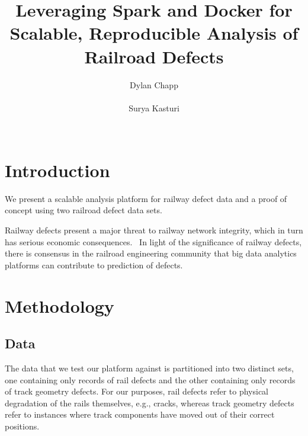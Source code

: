 \documentclass{sig-alternate-05-2015}
\begin{document}

\doi{}

\isbn{}

\conferenceinfo{}{}

\acmPrice{}

%
\conferenceinfo{}{}

\title{Leveraging Spark and Docker for Scalable, Reproducible Analysis of Railroad Defects}

\author{
\alignauthor
Dylan Chapp\\
       \\
\alignauthor
Surya Kasturi\\
       \\
}

\maketitle
\begin{abstract}
\end{abstract}

\keywords{}

\section{Introduction}
We present a scalable analysis platform for railway defect data and a proof of concept 
using two railroad defect data sets. 

Railway defects present a major threat to railway network 
integrity, which in turn has serious economic consequences.~\cite{Schafer:08}
In light of the significance of railway defects, there is consensus in the railroad engineering 
community that big data analytics platforms can contribute to prediction of 
defects.~\cite{Zarembski:14} 


\section{Methodology}

\subsection{Data}
The data that we test our platform against is partitioned into two distinct sets, one containing
only records of rail defects and the other containing only records of track geometry defects. 
For our purposes, rail defects refer to physical degradation of the rails themselves, e.g., cracks,
whereas track geometry defects refer to instances where track components have moved out of their 
correct positions.~\cite{RailroadSafety:15}
\end{document}

